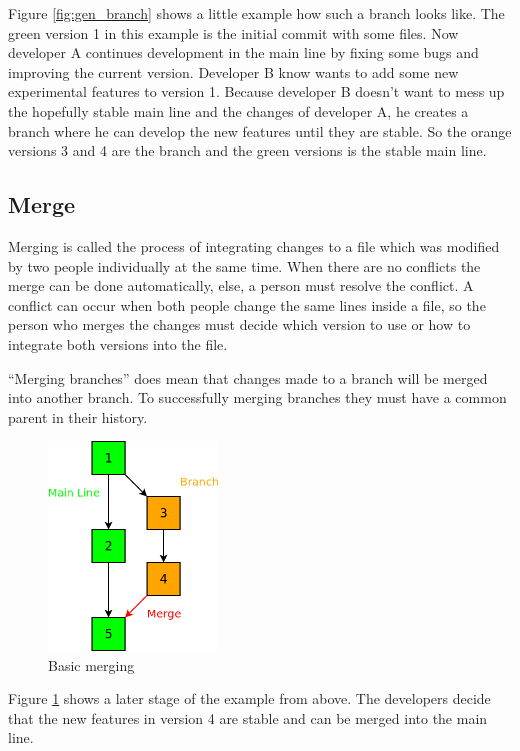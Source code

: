 Figure \ref{fig:gen_branch} shows a little example how such a branch looks like. The green version 1 in 
this example is the initial commit with some files. Now developer A continues development in the main line by fixing 
some bugs and improving the current version. Developer B know wants to add some new experimental 
features to version 1. Because developer B doesn't want to mess up the hopefully stable main line and the 
changes of developer A, he creates a branch where he can develop the new features until they are stable. 
So the orange versions 3 and 4 are the branch and the green versions is the stable main line.


\subsection{Merge}

Merging is called the process of integrating changes to a file which was modified by two people individually 
at the same time. When there are no conflicts the merge can be done automatically, else, a person must resolve 
the conflict. A conflict can occur when both people change the same lines inside a file, so the person who 
merges the changes must decide which version to use or how to integrate both versions into the file.

“Merging branches” does mean that changes made to a branch will be merged into another branch. 
To successfully merging branches they must have a common parent in their history.

\begin{figure}[ht]
  \centering
  \includegraphics[width=0.4\textwidth]{img/Gen_Merge}
  \caption{Basic merging}
  \label{fig:gen_merge} 
\end{figure}

Figure \ref{fig:gen_merge} shows a later stage of the example from above. The developers decide that 
the new features in version 4 are stable and can be merged into the main line.


